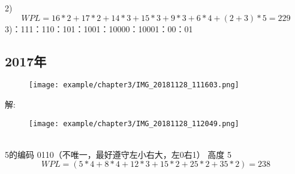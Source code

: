 2)\newline
$$ WPL =  16 * 2 + 17 * 2 + 14 *3 + 15 * 3 + 9 *3 + 6 * 4 + (2+3)* 5 = 229 $$
3)：111：110：101：1001：10000：10001：00：01\newline


\subsection{2017年}
\begin{figure}[H]
	\centering  %
	\texttt{[image: example/chapter3/IMG\_20181128\_111603.png]}
\end{figure}

解:\newline

\begin{figure}[H]
	\centering  %
	\texttt{[image: example/chapter3/IMG\_20181128\_112049.png]}
\end{figure}
~\\
5的编码 0110（不唯一，最好遵守左小右大，左0右1）\newline
高度   5\newline
$$WPL = (5*4 +8*4 + 12*3 + 15 *2 + 25 * 2 + 35 *2)=238 $$